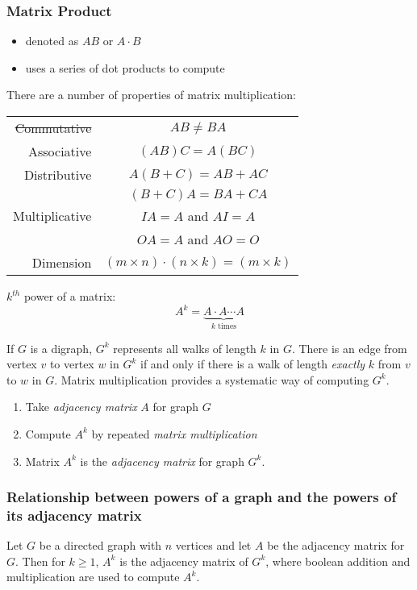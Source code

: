 \subsubsection*{Matrix Product}
\begin{itemize}
  \item denoted as $AB$ or $A \cdot B$
  \item uses a series of dot products to compute
\end{itemize}
There are a number of properties of matrix multiplication:
\begin{center}
  \begin{tabular}{rc}
    \sout{Commutative} & $AB \not = BA$                                   \\
    Associative        & $(AB)C = A(BC)$                                  \\
    Distributive       & $A(B + C) = AB + AC$                             \\
                       & $(B+C)A = BA + CA$                               \\
    Multiplicative     & $IA = A$ and $AI = A$                            \\
                       & $OA = A$ and $AO = O$                            \\
    Dimension          & $(m \times n) \cdot (n \times k) = (m \times k)$
  \end{tabular}
\end{center}
$k^{th}$ power of a matrix:
\[
  A^k = \underbrace{A \cdot A \cdots A}_{k \text{ times}}
\]

If $G$ is a digraph, $G^k$ represents all walks of length $k$ in $G$.
There is an edge from vertex $v$ to vertex $w$ in $G^k$ if and only if there is a walk of length \textit{exactly}
$k$ from $v$ to $w$ in $G$. Matrix multiplication provides a systematic way of computing $G^k$.
\begin{enumerate}
  \item Take \textit{adjacency matrix} $A$ for graph $G$
  \item Compute $A^k$ by repeated \textit{matrix multiplication}
  \item Matrix $A^k$ is the \textit{adjacency matrix} for graph $G^k$.
\end{enumerate}

\subsubsection*{Relationship between powers of a graph and the powers of its adjacency matrix}
Let $G$ be a directed graph with $n$ vertices and let $A$ be the adjacency matrix for $G$.
Then for $k \geq 1$, $A^k$ is the adjacency matrix of $G^k$,
where boolean addition and multiplication are used to compute $A^k$.


